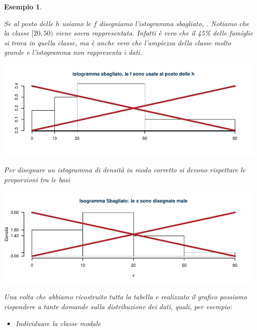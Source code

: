 \documentclass[
  11pt,
]{book}
\providecommand{\tightlist}{%
  \setlength{\itemsep}{0pt}\setlength{\parskip}{0pt}}
\theoremstyle{mytheoremstyle}
\theoremstyle{mydefstyle}
\newtheorem{example}{{Esempio}}[section]
\newenvironment{att}
  {
\begin{tcolorbox}[enhanced,arc=0.1mm,boxrule=1pt,colback=white,colframe=ared,title=\bf\small \fontfamily{lmss}\selectfont \faExclamationTriangle \hspace{.5 cm} Attenzione,drop fuzzy shadow]
}{
\end{tcolorbox}
  }
\begin{document}
\begin{example}
\begin{att}

Se al posto delle \(h\) usiamo le \(f\) disegniamo l'istogramma \emph{sbagliato}, . Notiamo che la classe \([20,50)\)
viene sovra rappresentata. Infatti è vero che il 45\% delle famiglie si trova in quella classe, ma è anche vero che l'ampiezza della classe molto grande e l'istogramma non rappresenta i dati.

\begin{center}\includegraphics{Appunti_di_Statistica_2025_files/figure-latex/04a-Istogramma-3-1} \end{center}

\end{att}

\begin{att}

Per disegnare un istogramma di densità in modo corretto si devono rispettare le proporzioni
tra le basi

\begin{center}\includegraphics{Appunti_di_Statistica_2025_files/figure-latex/04a-Istogramma-4-1} \end{center}

\end{att}

Una volta che abbiamo ricostruito tutta la tabella e realizzato il grafico possiamo
rispondere a tante domande sulla distribuzione dei dati, quali, per esempio:

\begin{itemize}
\tightlist
\item
  Individuare la classe modale
\end{itemize}


\end{example}
\end{document}
